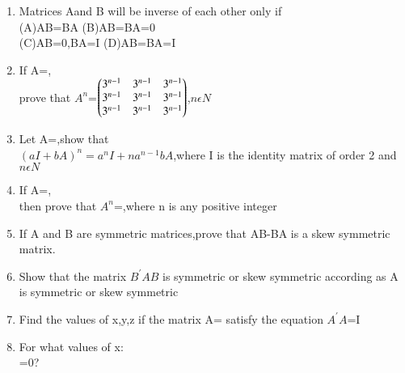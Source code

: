 \begin{enumerate}[label=\arabic*.,ref=\thesubsection.\theenumi]
  \item Matrices Aand B will be inverse of each other only if\\
  (A)AB=BA (B)AB=BA=0\\
  (C)AB=0,BA=I (D)AB=BA=I\\
  
  \item If A=,\\prove that $A^{n}$=$\begin{pmatrix}3^{n-1} &3^{n-1}&3^{n-1}\\3^{n-1}&3^{n-1}&3^{n-1}\\3^{n-1}&3^{n-1} &3^{n-1}\end{pmatrix}$,$n \epsilon N$\\
\solution

  \item Let A=,show that \\$(aI+bA)^{n}=a^{n}I+na^{n-1}bA$,where I is the identity matrix of order 2 and $n \epsilon N$\\
  \item If A=,\\then prove that $A^{n}$=,where n is any positive integer\\
  \item If A and B are symmetric matrices,prove that AB-BA is a skew symmetric matrix.\\
  \item Show that the matrix $ B^{'}AB$ is symmetric or skew symmetric according as A is symmetric or skew symmetric\\
  
  \item Find the values of x,y,z if the matrix A= satisfy the equation $A^{'}A$=I\\
  \item For what values of x: \\=0?\\
\solution



\end{enumerate}
